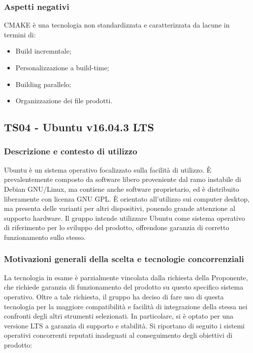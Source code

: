 \documentclass[./../Technology Baseline.tex]{subfiles}
\begin{document}
\subsubsection{Aspetti negativi}
CMAKE è una tecnologia non standardizzata e caratterizzata da lacune in termini di:
\begin{itemize}
	\item Build incremntale;
	\item Personalizzazione a build-time;
	\item Building parallelo;
	\item Organizzazione dei file prodotti.
\end{itemize}

\subsection{TS04 - Ubuntu v16.04.3 LTS}

\subsubsection{Descrizione e contesto di utilizzo}
Ubuntu è un sistema operativo focalizzato sulla facilità di utilizzo. È prevalentemente composto da software libero proveniente dal ramo instabile di Debian GNU/Linux, ma contiene anche software proprietario, ed è distribuito liberamente con licenza GNU GPL. È orientato all'utilizzo sui computer desktop, ma presenta delle varianti per altri dispositivi, ponendo grande attenzione al supporto hardware. Il gruppo intende utilizzare Ubuntu come sistema operativo di riferimento per lo sviluppo del prodotto, offrendone garanzia di corretto funzionamento sullo stesso.

\subsubsection{Motivazioni generali della scelta e tecnologie concorrenziali}
La tecnologia in esame è parzialmente vincolata dalla richiesta della Proponente, che richiede garanzia di funzionamento del prodotto su questo specifico sistema operativo. Oltre a tale richiesta, il gruppo ha deciso di fare uso di questa tecnologia per la maggiore compatibilità e facilità di integrazione della stessa nei confronti degli altri strumenti selezionati. In particolare, si è optato per una versione LTS a garanzia di supporto e stabilità. Si riportano di seguito i sistemi operativi concorrenti reputati inadeguati al conseguimento degli obiettivi di prodotto:
\end{document}
